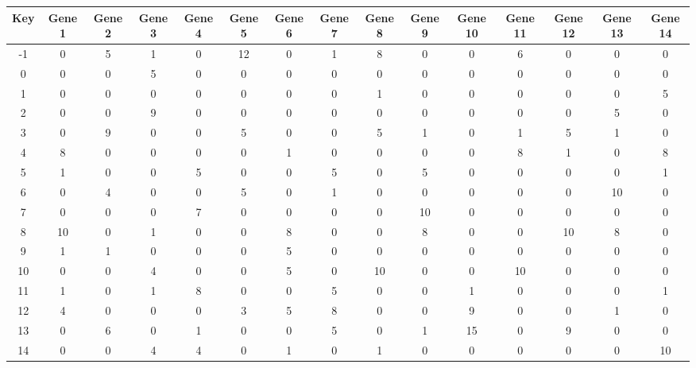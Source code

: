 \begin{tabular}{|c|c|c|c|c|c|c|c|c|c|c|c|c|c|c|}
\hline
Key & Gene 1 & Gene 2 & Gene 3 & Gene 4 & Gene 5 & Gene 6 & Gene 7 & Gene 8 & Gene 9 & Gene 10 & Gene 11 & Gene 12 & Gene 13 & Gene 14 \\
\hline
-1 & 0 & 5 & 1 & 0 & 12 & 0 & 1 & 8 & 0 & 0 & 6 & 0 & 0 & 0 \\
0 & 0 & 0 & 5 & 0 & 0 & 0 & 0 & 0 & 0 & 0 & 0 & 0 & 0 & 0 \\
1 & 0 & 0 & 0 & 0 & 0 & 0 & 0 & 1 & 0 & 0 & 0 & 0 & 0 & 5 \\
2 & 0 & 0 & 9 & 0 & 0 & 0 & 0 & 0 & 0 & 0 & 0 & 0 & 5 & 0 \\
3 & 0 & 9 & 0 & 0 & 5 & 0 & 0 & 5 & 1 & 0 & 1 & 5 & 1 & 0 \\
4 & 8 & 0 & 0 & 0 & 0 & 1 & 0 & 0 & 0 & 0 & 8 & 1 & 0 & 8 \\
5 & 1 & 0 & 0 & 5 & 0 & 0 & 5 & 0 & 5 & 0 & 0 & 0 & 0 & 1 \\
6 & 0 & 4 & 0 & 0 & 5 & 0 & 1 & 0 & 0 & 0 & 0 & 0 & 10 & 0 \\
7 & 0 & 0 & 0 & 7 & 0 & 0 & 0 & 0 & 10 & 0 & 0 & 0 & 0 & 0 \\
8 & 10 & 0 & 1 & 0 & 0 & 8 & 0 & 0 & 8 & 0 & 0 & 10 & 8 & 0 \\
9 & 1 & 1 & 0 & 0 & 0 & 5 & 0 & 0 & 0 & 0 & 0 & 0 & 0 & 0 \\
10 & 0 & 0 & 4 & 0 & 0 & 5 & 0 & 10 & 0 & 0 & 10 & 0 & 0 & 0 \\
11 & 1 & 0 & 1 & 8 & 0 & 0 & 5 & 0 & 0 & 1 & 0 & 0 & 0 & 1 \\
12 & 4 & 0 & 0 & 0 & 3 & 5 & 8 & 0 & 0 & 9 & 0 & 0 & 1 & 0 \\
13 & 0 & 6 & 0 & 1 & 0 & 0 & 5 & 0 & 1 & 15 & 0 & 9 & 0 & 0 \\
14 & 0 & 0 & 4 & 4 & 0 & 1 & 0 & 1 & 0 & 0 & 0 & 0 & 0 & 10 \\
\hline
\end{tabular}